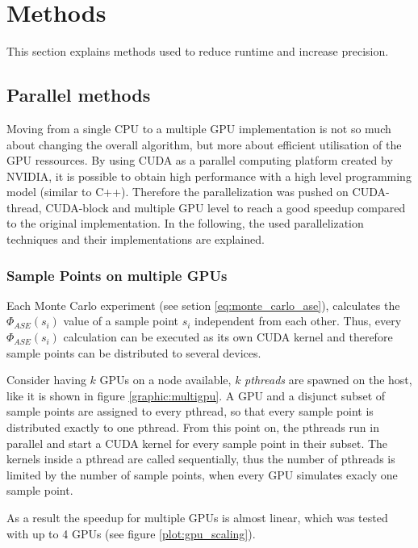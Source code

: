\section{Methods}
This section explains methods used to reduce runtime and
increase precision.

\subsection{Parallel methods}
\label{subsec:parallel_methods}
Moving from a single CPU to a multiple
GPU implementation is not so much about changing the overall algorithm,
but more about efficient utilisation of the GPU ressources. 
By using CUDA as a parallel computing platform created by NVIDIA,
it is possible to obtain high performance with a high level 
programming model (similar to C++). Therefore the parallelization was pushed on CUDA-thread, 
CUDA-block and multiple GPU level to reach a good speedup compared to 
the original implementation.
In the following, the used parallelization
techniques and their implementations are explained.

\subsubsection{Sample Points on multiple GPUs}

Each Monte Carlo experiment (see setion \ref{eq:monte_carlo_ase}), calculates the $\Phi_{ASE}(s_i)$ 
value of a sample point $s_i$ independent from each other.
Thus, every $\Phi_{ASE}(s_i)$ calculation can be executed as its own CUDA kernel
and therefore sample points can be distributed to several devices.

Consider having $k$ GPUs on a node available, 
$k$ \emph{pthreads} are spawned on the host, like it
is shown in figure \ref{graphic:multigpu}. A GPU and a
disjunct subset of sample points are assigned to every pthread, so that every
sample point is distributed exactly to one pthread.
From this point on, the pthreads run in parallel and start a
CUDA kernel for every sample point in their subset.
The kernels inside a pthread are called sequentially,
thus the number of pthreads is limited by the number of sample points, when 
every GPU simulates exacly one sample point.

As a result the speedup for multiple
GPUs is almost linear, which was tested with up to 4 GPUs (see figure \ref{plot:gpu_scaling}).
    
